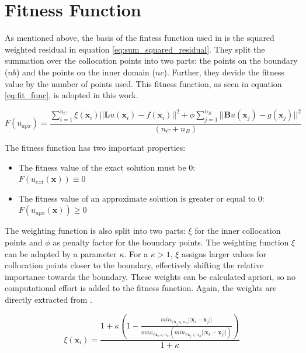 \documentclass[./\jobname.tex]{subfiles}
\begin{document}
\section{Fitness Function}
\label{chap:fit_func}

As mentioned above, the basis of the fintess function used in \cite{chaquet_using_2019} is the squared weighted residual in equation \ref{eq:sum_squared_residual}. They split the summation over the collocation points into two parts: the points on the boundary ($nb$) and the points on the inner domain ($nc$). Further, they devide the fitness value by the number of points used. This fitness function, as seen in equation \ref{eq:fit_func}, is adopted in this work. 

\begin{equation}
\label{eq:fit_func}
F(u_{apx}) = \frac{\sum_{i=1}^{n_C} \xi (\mathbf{x}_i) || \mathbf{L}u(\mathbf{x}_i) - f(\mathbf{x}_i)||^2 + \phi \sum_{j=1}^{n_B} || \mathbf{B}u(\mathbf{x}_j) - g(\mathbf{x}_j)||^2}{(n_C + n_B)}  
\end{equation}

The fitness function has two important properties: 
\begin{itemize}
	\item The fitness value of the exact solution must be 0:\\
	$F(u_{ext}(\mathbf{x})) \equiv 0$ 
	\item The fitness value of an approximate solution is greater or equal to 0: \\
	$F(u_{apx}(\mathbf{x})) \geq 0$
\end{itemize}
 

The weighting function is also split into two parts: $\xi$ for the inner collocation points and $\phi$ as penalty factor for the boundary points. The weighting function $\xi$ can be adapted by a parameter $\kappa$. For a $\kappa > 1$, $\xi$ assigns larger values for collocation points closer to the boundary, effectively shifting the relative importance towards the boundary. These weights can be calculated apriori, so no computational effort is added to the fitness function. Again, the weights are directly extracted from \cite{chaquet_using_2019}. 

\begin{equation}
\label{eq:nc_weight}
\xi(\mathbf{x}_i) = \frac{1 + \kappa \left(1 - \frac{min_{\forall \mathbf{x}_j\in n_B}|| \mathbf{x}_i - \mathbf{x}_j ||}{max_{\forall\mathbf{x}_k \in n_C}(min_{\forall \mathbf{x}_j \in n_B} || \mathbf{x}_k - \mathbf{x}_j ||)}\right)}{1 + \kappa}
\end{equation}
\end{document}
